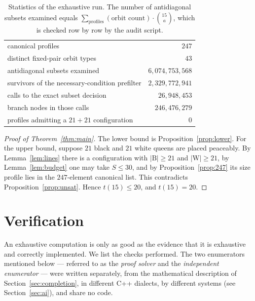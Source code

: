 \documentclass[11pt]{amsart}
\theoremstyle{remark}
\newcommand{\Bl}{\mathrm{B}}
\newcommand{\Wh}{\mathrm{W}}
\begin{document}
\begin{table}[h]
\centering
\begin{tabular}{@{}lr@{}}
\toprule
canonical profiles                 & $247$ \\
distinct fixed-pair orbit types    & $43$ \\
antidiagonal subsets examined      & $6{,}074{,}753{,}568$ \\
survivors of the necessary-condition prefilter & $2{,}329{,}772{,}941$ \\
calls to the exact subset decision & $26{,}948{,}453$ \\
branch nodes in those calls        & $246{,}476{,}279$ \\
profiles admitting a $21+21$ configuration & $0$ \\
\bottomrule
\end{tabular}
\medskip
\caption{Statistics of the exhaustive run. The number of antidiagonal subsets examined equals $\sum_{\text{profiles}} (\text{orbit count})\cdot\binom{15}{a}$, which is checked row by row by the audit script.}\label{tab:stats}
\end{table}

\begin{proof}[Proof of Theorem~\ref{thm:main}]
The lower bound is Proposition~\ref{prop:lower}. For the upper bound, suppose $21$ black and $21$ white queens are placed peaceably. By Lemma~\ref{lem:lines} there is a configuration with $|\Bl|\ge 21$ and $|\Wh|\ge 21$, by Lemma~\ref{lem:budget} one may take $S\le 30$, and by Proposition~\ref{prop:247} its size profile lies in the $247$-element canonical list. This contradicts Proposition~\ref{prop:unsat}. Hence $t(15)\le 20$, and $t(15)=20$.
\end{proof}

\section{Verification}\label{sec:verification}

An exhaustive computation is only as good as the evidence that it is exhaustive and correctly implemented. We list the checks performed. The two enumerators mentioned below --- referred to as the \emph{proof solver} and the \emph{independent enumerator} --- were written separately, from the mathematical description of Section~\ref{sec:completion}, in different C++ dialects, by different systems (see Section~\ref{sec:ai}), and share no code.
\end{document}
